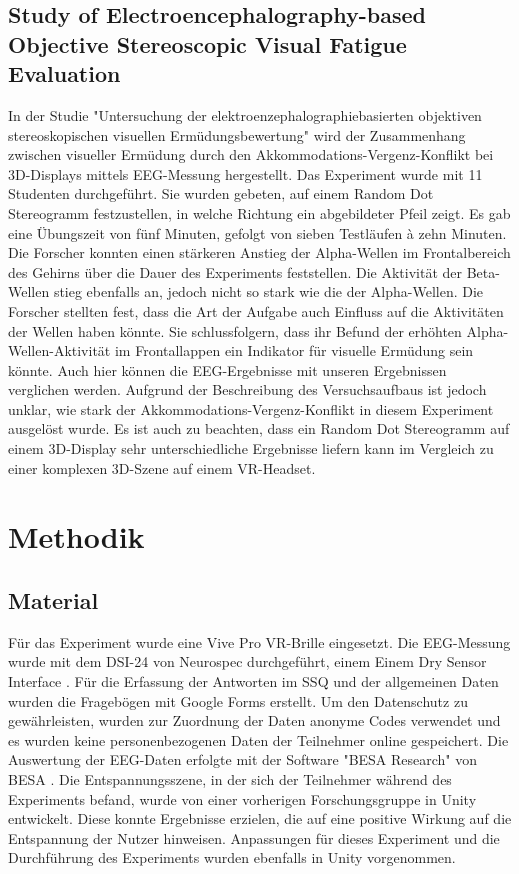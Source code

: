 \documentclass[conference]{IEEEtran}
\begin{document}
\subsection{Study of Electroencephalography-based Objective Stereoscopic Visual Fatigue Evaluation}
In der Studie "Untersuchung der elektroenzephalographiebasierten objektiven stereoskopischen visuellen Ermüdungsbewertung" \cite{b5} wird der Zusammenhang zwischen visueller Ermüdung durch den Akkommodations-Vergenz-Konflikt bei 3D-Displays mittels EEG-Messung hergestellt.
Das Experiment wurde mit 11 Studenten durchgeführt. Sie wurden gebeten, auf einem Random Dot Stereogramm festzustellen, in welche Richtung ein abgebildeter Pfeil zeigt. Es gab eine Übungszeit von fünf Minuten, gefolgt von sieben Testläufen à zehn Minuten.
Die Forscher konnten einen stärkeren Anstieg der Alpha-Wellen im Frontalbereich des Gehirns über die Dauer des Experiments feststellen. Die Aktivität der Beta-Wellen stieg ebenfalls an, jedoch nicht so stark wie die der Alpha-Wellen. Die Forscher stellten fest, dass die Art der Aufgabe auch Einfluss auf die Aktivitäten der Wellen haben könnte. Sie schlussfolgern, dass ihr Befund der erhöhten Alpha-Wellen-Aktivität im Frontallappen ein Indikator für visuelle Ermüdung sein könnte.
Auch hier können die EEG-Ergebnisse mit unseren Ergebnissen verglichen werden. Aufgrund der Beschreibung des Versuchsaufbaus ist jedoch unklar, wie stark der Akkommodations-Vergenz-Konflikt in diesem Experiment ausgelöst wurde. Es ist auch zu beachten, dass ein Random Dot Stereogramm auf einem 3D-Display sehr unterschiedliche Ergebnisse liefern kann im Vergleich zu einer komplexen 3D-Szene auf einem VR-Headset.
 

\section{Methodik}
\subsection{Material}
Für das Experiment wurde eine Vive Pro VR-Brille \cite{b11} eingesetzt. Die EEG-Messung wurde mit dem DSI-24 von Neurospec durchgeführt, einem Einem Dry Sensor Interface \cite{b9}. Für die Erfassung der Antworten im SSQ und der allgemeinen Daten wurden die Fragebögen mit Google Forms erstellt. Um den Datenschutz zu gewährleisten, wurden zur Zuordnung der Daten anonyme Codes verwendet und es wurden keine personenbezogenen Daten der Teilnehmer online gespeichert. Die Auswertung der EEG-Daten erfolgte mit der Software "BESA Research" von BESA \cite{b10}. Die Entspannungsszene, in der sich der Teilnehmer während des Experiments befand, wurde von einer vorherigen Forschungsgruppe in Unity entwickelt. Diese konnte Ergebnisse erzielen, die auf eine positive Wirkung auf die Entspannung der Nutzer hinweisen. Anpassungen für dieses Experiment und die Durchführung des Experiments wurden ebenfalls in Unity vorgenommen.
\end{document}
